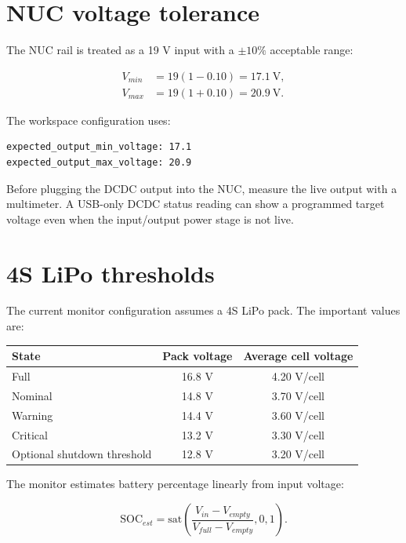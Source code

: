 \section{NUC voltage tolerance}

The NUC rail is treated as a 19 V input with a \(\pm 10\%\) acceptable range:

\begin{align}
V_{min} &= 19(1-0.10)=17.1\ \text{V},\\
V_{max} &= 19(1+0.10)=20.9\ \text{V}.
\end{align}

The workspace configuration uses:

\begin{lstlisting}[language={},caption={DCDC output thresholds in hardware YAML}]
expected_output_min_voltage: 17.1
expected_output_max_voltage: 20.9
\end{lstlisting}

Before plugging the DCDC output into the NUC, measure the live output with a multimeter. A USB-only DCDC status reading can show a programmed target voltage even when the input/output power stage is not live.

\section{4S LiPo thresholds}

The current monitor configuration assumes a 4S LiPo pack. The important values are:

\begin{center}
\begin{tabular}{lcc}
\toprule
State & Pack voltage & Average cell voltage\\
\midrule
Full & 16.8 V & 4.20 V/cell\\
Nominal & 14.8 V & 3.70 V/cell\\
Warning & 14.4 V & 3.60 V/cell\\
Critical & 13.2 V & 3.30 V/cell\\
Optional shutdown threshold & 12.8 V & 3.20 V/cell\\
\bottomrule
\end{tabular}
\end{center}

The monitor estimates battery percentage linearly from input voltage:

\begin{equation}
\mathrm{SOC}_{est}=\mathrm{sat}\left(\frac{V_{in}-V_{empty}}{V_{full}-V_{empty}},0,1\right).
\end{equation}

